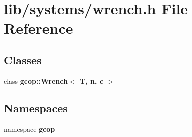 \section{lib/systems/wrench.h \-File \-Reference}
\label{wrench_8h}
\subsection*{\-Classes}
\begin{DoxyCompactItemize}
\item 
class {\bf gcop\-::\-Wrench$<$ T, n, c $>$}
\end{DoxyCompactItemize}
\subsection*{\-Namespaces}
\begin{DoxyCompactItemize}
\item 
namespace {\bf gcop}
\end{DoxyCompactItemize}
